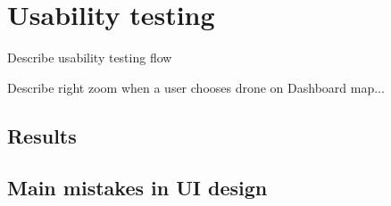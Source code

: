 \section{Usability testing}\label{sec:usability-testing}
Describe usability testing flow

Describe right zoom when a user chooses drone on Dashboard map...

\subsection{Results}\label{subsec:results}

\subsection{Main mistakes in UI design}\label{subsec:main-mistakes-in-ui-design}
